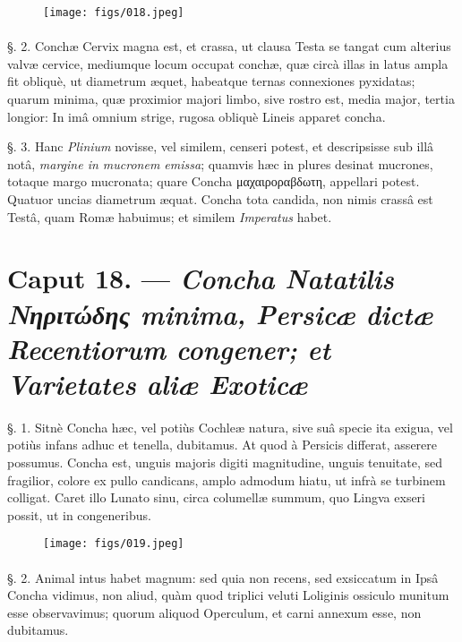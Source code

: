 \documentclass[a4paper, 11pt, oneside, polutonikogreek, german]{article}
\begin{document}
\begin{figure}[H]
\centering
\texttt{[image: figs/018.jpeg]}

\end{figure}
\paragraph{}
§. 2. Conchæ Cervix magna est, et crassa, ut clausa Testa se tangat cum alterius valvæ cervice, mediumque locum occupat conchæ, quæ circà illas in latus ampla fit obliquè, ut diametrum æquet, habeatque ternas connexiones pyxidatas; quarum minima, quæ proximior majori limbo, sive rostro est, media major, tertia longior: In imâ omnium strige, rugosa obliquè Lineis apparet concha.

§. 3. Hanc \emph{Plinium} novisse, vel similem, censeri potest, et descripsisse sub illâ notâ, \emph{margine in mucronem emissa}; quamvis hæc in plures desinat mucrones, totaque margo mucronata; quare Concha μαχαιροραβδωτη, appellari potest. Quatuor uncias diametrum æquat. Concha tota candida, non nimis crassâ est Testâ, quam Romæ habuimus; et similem \emph{Imperatus} habet.

\section{Caput 18. --- \emph{Concha Natatilis Νηριτώδης minima, Persicæ dictæ Recentiorum congener; et Varietates aliæ Exoticæ}}
\paragraph{}
§. 1. Sitnè Concha hæc, vel potiùs Cochleæ natura, sive suâ specie ita exigua, vel potiùs infans adhuc et tenella, dubitamus. At quod à Persicis differat, asserere possumus. Concha est, unguis majoris digiti magnitudine, unguis tenuitate, sed fragilior, colore ex pullo candicans, amplo admodum hiatu, ut infrà se turbinem colligat. Caret illo Lunato sinu, circa columellæ summum, quo Lingva exseri possit, ut in congeneribus.

\begin{figure}[H]
\centering
\texttt{[image: figs/019.jpeg]}

\end{figure}
\paragraph{}
§. 2. Animal intus habet magnum: sed quia non recens, sed exsiccatum in Ipsâ Concha vidimus, non aliud, quàm quod triplici veluti Loliginis ossiculo munitum esse observavimus; quorum aliquod Operculum, et carni annexum esse, non dubitamus.
\end{document}

